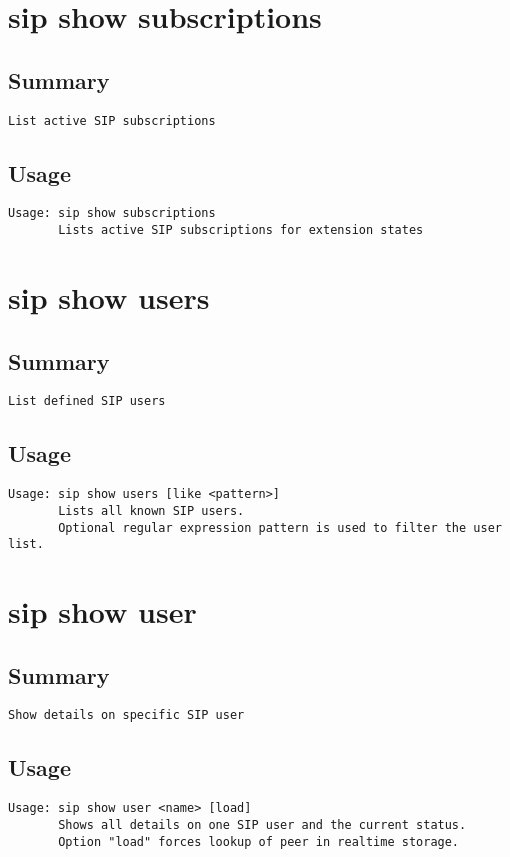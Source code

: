 \section{sip show subscriptions}
\subsection{Summary}
\begin{verbatim}
List active SIP subscriptions
\end{verbatim}
\subsection{Usage}
\begin{verbatim}
Usage: sip show subscriptions
       Lists active SIP subscriptions for extension states

\end{verbatim}


\section{sip show users}
\subsection{Summary}
\begin{verbatim}
List defined SIP users
\end{verbatim}
\subsection{Usage}
\begin{verbatim}
Usage: sip show users [like <pattern>]
       Lists all known SIP users.
       Optional regular expression pattern is used to filter the user list.

\end{verbatim}


\section{sip show user}
\subsection{Summary}
\begin{verbatim}
Show details on specific SIP user
\end{verbatim}
\subsection{Usage}
\begin{verbatim}
Usage: sip show user <name> [load]
       Shows all details on one SIP user and the current status.
       Option "load" forces lookup of peer in realtime storage.

\end{verbatim}


